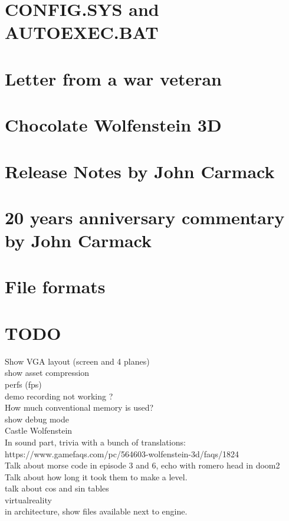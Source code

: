 \documentclass[8pt]{book}
\begin{document}
    \chapter{CONFIG.SYS and AUTOEXEC.BAT}
         
    \chapter{Letter from a war veteran}
    \chapter{Chocolate Wolfenstein 3D}
    \chapter{Release Notes by John Carmack}
        
    \chapter{20 years anniversary commentary by John Carmack}
        
    
    \chapter{File formats}
    
        
            
    
                    
        
                            
    
    \chapter{TODO}
    Show VGA layout (screen and 4 planes)\\
    show asset compression\\
    perfs (fps)\\
demo recording not working ?\\
How much conventional memory is used?\\
show debug mode\\
Castle Wolfenstein\\
In sound part, trivia with a bunch of translations: https://www.gamefaqs.com/pc/564603-wolfenstein-3d/faqs/1824\\
Talk about morse code in episode 3 and 6, echo with romero head in doom2\\
Talk about how long it took them to make a level.\\
talk about cos and sin tables\\
virtualreality\\
in architecture, show files available next to engine.\\
\end{document}
